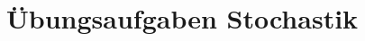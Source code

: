 \documentclass[11pt, oneside]{report}
\begin{document}
	\part{Übungsaufgaben Stochastik}
	
	
	
	
	
	
	
	
\end{document}

